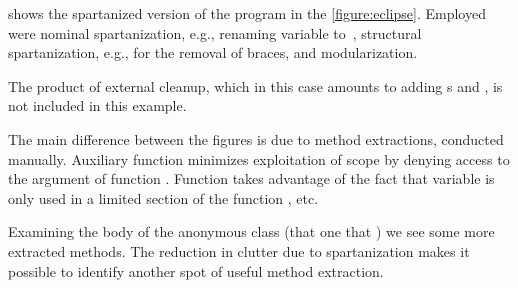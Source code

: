 
 shows the spartanized version of the program in
the \cref{figure:eclipse}. Employed were nominal spartanization, e.g., renaming
variable  to~\cc{\$}, structural spartanization, e.g., for the
removal of braces, and modularization.

The product of external cleanup, which in this case amounts to adding
s and , is not included in this example.

The main difference between the figures is due to method extractions, conducted
manually. Auxiliary  function  minimizes exploitation of
scope by denying access to the  argument of function .
Function  takes advantage of the fact that variable
 is only used in a limited section of the  function
, etc.

Examining the body of the anonymous class (that one that 
) we see some more extracted methods. The reduction in clutter
due to spartanization makes it possible to identify another spot of useful
method extraction.

